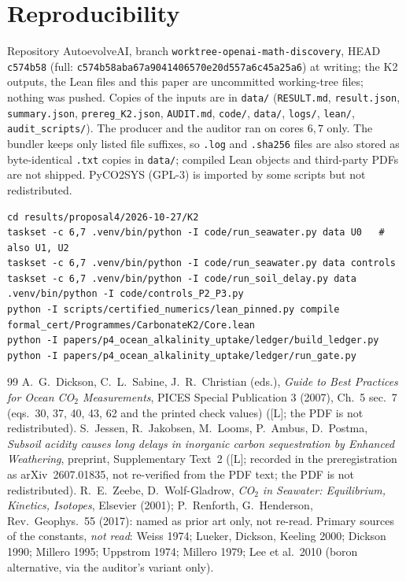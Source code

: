 \documentclass[10pt]{article}
\newcommand{\tier}[1]{\textsf{[#1]}}
\newcommand{\tL}{\tier{L}}
\newcommand{\COtwo}{CO$_2$}
\begin{document}
\section{Reproducibility}\label{sec:repro}
Repository AutoevolveAI, branch \texttt{worktree-openai-math-discovery}, HEAD \texttt{c574b58} (full: {\scriptsize\texttt{c574b58aba67a9041406570e20d557a6c45a25a6}}) at writing; the K2 outputs, the Lean files and this paper are uncommitted working-tree files; nothing was pushed. Copies of the inputs are in \texttt{data/} (\texttt{RESULT.md}, \texttt{result.json}, \texttt{summary.json}, \texttt{prereg\_K2.json}, \texttt{AUDIT.md}, \texttt{code/}, \texttt{data/}, \texttt{logs/}, \texttt{lean/}, \texttt{audit\_scripts/}). The producer and the auditor ran on cores $6,7$ only. The bundler keeps only listed file suffixes, so \texttt{.log} and \texttt{.sha256} files are also stored as byte-identical \texttt{.txt} copies in \texttt{data/}; compiled Lean objects and third-party PDFs are not shipped. PyCO2SYS (GPL-3) is imported by some scripts but not redistributed.
\begin{lstlisting}[basicstyle=\ttfamily\scriptsize]
cd results/proposal4/2026-10-27/K2
taskset -c 6,7 .venv/bin/python -I code/run_seawater.py data U0   # also U1, U2
taskset -c 6,7 .venv/bin/python -I code/run_seawater.py data controls
taskset -c 6,7 .venv/bin/python -I code/run_soil_delay.py data
.venv/bin/python -I code/controls_P2_P3.py
python -I scripts/certified_numerics/lean_pinned.py compile formal_cert/Programmes/CarbonateK2/Core.lean
python -I papers/p4_ocean_alkalinity_uptake/ledger/build_ledger.py
python -I papers/p4_ocean_alkalinity_uptake/ledger/run_gate.py
\end{lstlisting}

\begin{thebibliography}{99}\small
{} A.\ G.\ Dickson, C.\ L.\ Sabine, J.\ R.\ Christian (eds.), \emph{Guide to Best Practices for Ocean \COtwo{} Measurements}, PICES Special Publication 3 (2007), Ch.~5 sec.~7 (eqs.\ 30, 37, 40, 43, 62 and the printed check values) (\tL; the PDF is not redistributed).
 S.\ Jessen, R.\ Jakobsen, M.\ Looms, P.\ Ambus, D.\ Postma, \emph{Subsoil acidity causes long delays in inorganic carbon sequestration by Enhanced Weathering}, preprint, Supplementary Text~2 (\tL; recorded in the preregistration as arXiv~2607.01835, not re-verified from the PDF text; the PDF is not redistributed).
 R.\ E.\ Zeebe, D.\ Wolf-Gladrow, \emph{\COtwo{} in Seawater: Equilibrium, Kinetics, Isotopes}, Elsevier (2001); P.\ Renforth, G.\ Henderson, Rev.\ Geophys.\ 55 (2017): named as prior art only, not re-read.
 Primary sources of the constants, \emph{not read}: Weiss 1974; Lueker, Dickson, Keeling 2000; Dickson 1990; Millero 1995; Uppstrom 1974; Millero 1979; Lee et al.\ 2010 (boron alternative, via the auditor's variant only).
\end{thebibliography}
\end{document}

